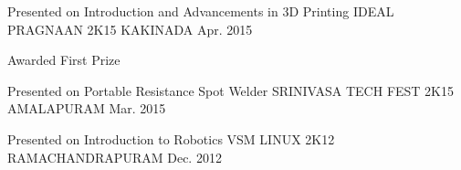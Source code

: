\begin{cventries}
\cventry
    {Presented on Introduction and Advancements in 3D Printing }
    {IDEAL PRAGNAAN 2K15}
    {KAKINADA}
    {Apr. 2015}
    {
      \begin{cvitems}
	\item {Awarded  First Prize}
      \end{cvitems}
    }
  \cventry
    {Presented on Portable Resistance Spot Welder}
    {SRINIVASA TECH FEST 2K15}
    {AMALAPURAM}
    {Mar. 2015}
    {
      \begin{cvitems}
      \end{cvitems}
    }
\cventry
    {Presented on Introduction to Robotics }
    {VSM LINUX 2K12}
    {RAMACHANDRAPURAM}
    {Dec. 2012}
    {
      \begin{cvitems}
      \end{cvitems}
    }
\cventry
    { }
    { }
    { }
    { }
    {
      \begin{cvitems}
      \end{cvitems}
    }
\end{cventries}

